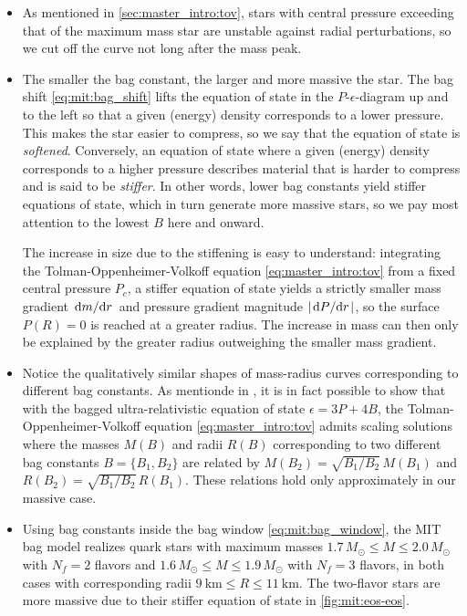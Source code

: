 \begin{itemize}
\item As mentioned in \cref{sec:master_intro:tov},
      stars with central pressure exceeding that of the maximum mass star are unstable against radial perturbations,
      so we cut off the curve not long after the mass peak.
\item The smaller the bag constant, the larger and more massive the star.
      The bag shift \eqref{eq:mit:bag_shift} lifts the equation of state in the $P$-$\epsilon$-diagram up and to the left
      so that a given (energy) density corresponds to a lower pressure.
      This makes the star easier to compress, so we say that the equation of state is \emph{softened}.
      Conversely, an equation of state where a given (energy) density corresponds to a higher pressure
      describes material that is harder to compress and is said to be \emph{stiffer}.
      In other words, lower bag constants yield stiffer equations of state,
      which in turn generate more massive stars,
      so we pay most attention to the lowest $B$ here and onward.

      The increase in size due to the stiffening is easy to understand:
      integrating the Tolman-Oppenheimer-Volkoff equation \eqref{eq:master_intro:tov} from a fixed central pressure $P_c$,
      a stiffer equation of state yields a strictly smaller mass gradient $\odv{m}/{r}$ and pressure gradient magnitude $\abs{\odv{P}/{r}}$,
      so the surface $P(R)=0$ is reached at a greater radius.
      The increase in mass can then only be explained by the greater radius outweighing the smaller mass gradient.
\item Notice the qualitatively similar shapes of mass-radius curves corresponding to different bag constants.
      As mentionde in \cite[equation 8.29]{ref:glendenning},
      it is in fact possible to show that with the bagged ultra-relativistic equation of state $\epsilon = 3P + 4B$,
      the Tolman-Oppenheimer-Volkoff equation \eqref{eq:master_intro:tov} admits scaling solutions
      where the masses $M(B)$ and radii $R(B)$ corresponding to two different bag constants $B=\{B_1,B_2\}$
      are related by $M(B_2) = \sqrt{B_1/B_2} \, M(B_1)$ and $R(B_2) = \sqrt{B_1/B_2} \, R(B_1)$.
      These relations hold only approximately in our massive case.
\item Using bag constants inside the bag window \eqref{eq:mit:bag_window},
      the MIT bag model realizes quark stars with maximum masses
      $1.7 \, M_\odot \leq M \leq 2.0 \, M_\odot$ with $N_f=2$ flavors
      and $1.6 \, M_\odot \leq M \leq 1.9 \, M_\odot$ with $N_f=3$ flavors,
      in both cases with corresponding radii $\SI{9}{\kilo\meter} \leq R \leq \SI{11}{\kilo\meter}$.
      The two-flavor stars are more massive due to their stiffer equation of state in \cref{fig:mit:eos-eos}.
\end{itemize}

